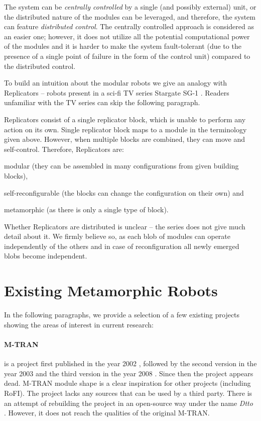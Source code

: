 The system can be \emph{centrally controlled} by a single (and possibly
external) unit, or the distributed nature of the modules can be leveraged, and
therefore, the system can feature \emph{distributed control}. The centrally
controlled approach is considered as an easier one; however, it does not utilize
all the potential computational power of the modules and it is harder to make
the system fault-tolerant (due to the presence of a single point of failure in
the form of the control unit) compared to the distributed control.

To build an intuition about the modular robots we give an analogy with
Replicators -- robots present in a sci-fi TV series Stargate
SG-1 \cite{wright_stargate_1997}. Readers unfamiliar with the TV series can skip
the following paragraph.

Replicators consist of a single replicator block, which is unable to perform any
action on its own. Single replicator block maps to a module in the terminology
given above. However, when multiple blocks are combined, they can move and
self-control. Therefore, Replicators are:
\begin{enumerate*}
    \item modular (they can be assembled in many configurations from given
    building blocks),
    \item self-reconfigurable (the blocks can change the configuration on their
    own) and
    \item metamorphic (as there is only a single type of block).
\end{enumerate*}
Whether Replicators are distributed is unclear -- the series does not give much
detail about it. We firmly believe so, as each blob of modules can operate
independently of the others and in case of reconfiguration all newly emerged
blobs become independent.

\section{Existing Metamorphic Robots}

In the following paragraphs, we provide a selection of a few existing projects
showing the areas of interest in current research:

\paragraph{M-TRAN} is a project first published in the year 2002
\cite{murata_m-tran:_2002}, followed by the second version in the year 2003
\cite{haruhisa_kurokawa_m-tran_2003} and the third version in the year 2008
\cite{kurokawa_distributed_2008}. Since then the project appears dead. M-TRAN
module shape is a clear inspiration for other projects (including RoFI). The
project lacks any sources that can be used by a third party. There is an attempt
of rebuilding the project in an open-source way under the name \emph{Dtto}
\cite{noauthor_dtto_nodate}. However, it does not reach the qualities of the
original M-TRAN.

